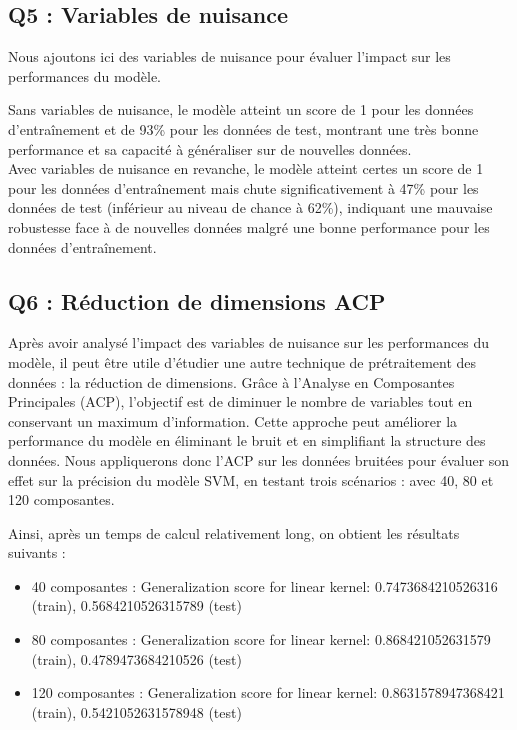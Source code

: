 \documentclass{scrartcl}
\begin{document}
\subsection{Q5 : Variables de nuisance}
\hspace{7pt} Nous ajoutons ici des variables de nuisance pour évaluer l'impact sur les performances du modèle.\newline

Sans variables de nuisance, le modèle atteint un score de 1 pour les données d'entraînement et de 93\% pour les données de test, montrant une très bonne performance et sa capacité à généraliser sur de nouvelles données.\\
Avec variables de nuisance en revanche, le modèle atteint certes un score de 1 pour les données d'entraînement mais chute significativement à 47\% pour les données de test (inférieur au niveau de chance à 62\%), indiquant une mauvaise robustesse face à de nouvelles données malgré une bonne performance pour les données d'entraînement.

\subsection{Q6 : Réduction de dimensions ACP}
\hspace{7pt} Après avoir analysé l'impact des variables de nuisance sur les performances du modèle, il peut être utile d'étudier une autre technique de prétraitement des données : la réduction de dimensions. Grâce à l'Analyse en Composantes Principales (ACP), l'objectif est de diminuer le nombre de variables tout en conservant un maximum d'information. Cette approche peut améliorer la performance du modèle en éliminant le bruit et en simplifiant la structure des données. Nous appliquerons donc l'ACP sur les données bruitées pour évaluer son effet sur la précision du modèle SVM, en testant trois scénarios : avec 40, 80 et 120 composantes.\newline

Ainsi, après un temps de calcul relativement long, on obtient les résultats suivants :
\begin{itemize}
    \item 40 composantes : Generalization score for linear kernel: 0.7473684210526316 (train), 0.5684210526315789 (test) 
    \item 80 composantes : Generalization score for linear kernel: 0.868421052631579 (train), 0.4789473684210526 (test) 
    \item 120 composantes : Generalization score for linear kernel: 0.8631578947368421 (train), 0.5421052631578948 (test) 
\end{itemize}
\end{document}
